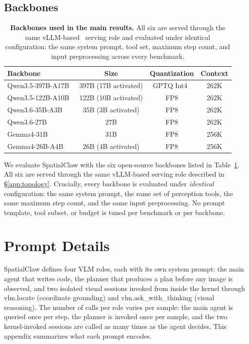 \documentclass{llmxive}
\providecommand{\ours}{SpatialClaw}
\providecommand{\arraystretch}{1.15}
\providecommand{\apicode}[1]{#1}
\begin{document}
\subsection{Backbones}
\label{app:backbones}
\begin{table}[!htbp]
\centering
\setlength{\tabcolsep}{6pt}
\renewcommand{\arraystretch}{1.15}
{\small
\begin{tabular}{lccc}
\toprule
\textbf{Backbone} & \textbf{Size} & \textbf{Quantization} & \textbf{Context} \\
\midrule
Qwen3.5-397B-A17B~\citep{qwen3.5}        & 397B (17B activated) & GPTQ Int4~\citep{frantar-gptq} & 262K \\
Qwen3.5-122B-A10B~\citep{qwen3.5}        & 122B (10B activated) & FP8       & 262K \\
Qwen3.6-35B-A3B~\citep{qwen36_35b_a3b}   & 35B  (3B activated)  & FP8       & 262K \\
Qwen3.6-27B~\citep{qwen3.6-27b}          & 27B                  & FP8       & 262K \\
Gemma4-31B~\citep{gemma4}                & 31B                  & FP8       & 256K \\
Gemma4-26B-A4B~\citep{gemma4}            & 26B  (4B activated)  & FP8       & 256K \\
\bottomrule
\end{tabular}}
\caption{\textbf{Backbones used in the main results.} All six are served through the same vLLM-based~\citep{kwon2023efficient} serving role and evaluated under identical configuration: the same system prompt, tool set, maximum step count, and input preprocessing across every benchmark.}
\label{tab:backbones}
\end{table}

We evaluate \ours{} with the six open-source backbones listed in Table~\ref{tab:backbones}. All six are served through the same vLLM-based serving role described in \S\ref{app:topology}. Crucially, every backbone is evaluated under \emph{identical} configuration: the same system prompt, the same set of perception tools, the same maximum step count, and the same input preprocessing. No prompt template, tool subset, or budget is tuned per benchmark or per backbone.

\section{Prompt Details}
\label{app:prompts}

\ours{} defines four VLM roles, each with its own system prompt: the main agent that writes code, the planner that produces a plan before any image is observed, and two isolated visual sessions invoked from inside the kernel through \apicode{vlm.locate} (coordinate grounding) and \apicode{vlm.ask_with_thinking} (visual reasoning). The number of calls per role varies per sample: the main agent is queried once per step, the planner is invoked once per sample, and the two kernel-invoked sessions are called as many times as the agent decides. This appendix summarizes what each prompt encodes.
\end{document}
